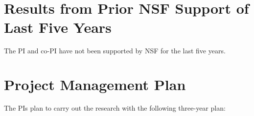 \documentclass[11pt]{article}
\begin{document}
\section{Results from Prior NSF Support of Last Five Years}

The PI and co-PI have not been supported by NSF for the last five years.



\section{Project Management Plan}

The PIs plan to carry out the research with the following three-year plan:
\end{document}
